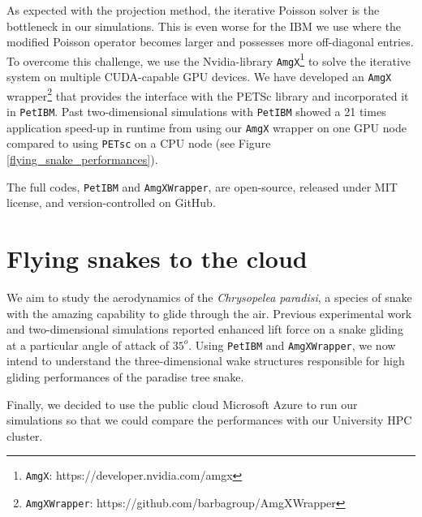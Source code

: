 \documentclass[review]{elsarticle}
\begin{document}
As expected with the projection method, the iterative Poisson solver is the bottleneck in our simulations.
This is even worse for the IBM we use where the modified Poisson operator becomes larger and possesses more off-diagonal entries.
To overcome this challenge, we use the Nvidia-library \texttt{AmgX}\footnote{\texttt{AmgX}: https://developer.nvidia.com/amgx} to solve the iterative system on multiple CUDA-capable GPU devices.
We have developed an \texttt{AmgX} wrapper\footnote{\texttt{AmgXWrapper}: https://github.com/barbagroup/AmgXWrapper} that provides the interface with the PETSc library and incorporated it in \texttt{PetIBM}.
Past two-dimensional simulations with \texttt{PetIBM} showed a 21 times application speed-up in runtime from using our \texttt{AmgX} wrapper on one GPU node compared to using \texttt{PETsc} on a CPU node (see Figure \ref{flying_snake_performances}).

The full codes, \texttt{PetIBM} and \texttt{AmgXWrapper}, are open-source, released under MIT license, and version-controlled on GitHub.


\section{Flying snakes to the cloud}

We aim to study the aerodynamics of the \textit{Chrysopelea paradisi}, a species of snake with the amazing capability to glide through the air.
Previous experimental work \cite{Holden_et_al_2014} and two-dimensional simulations \cite{Krishnan_et_al_2014} reported enhanced lift force on a snake gliding at a particular angle of attack of $35^o$.
Using \texttt{PetIBM} and \texttt{AmgXWrapper}, we now intend to understand the three-dimensional wake structures responsible for high gliding performances of the paradise tree snake.

Finally, we decided to use the public cloud Microsoft Azure to run our simulations so that we could compare the performances with our University HPC cluster.

\end{document}
